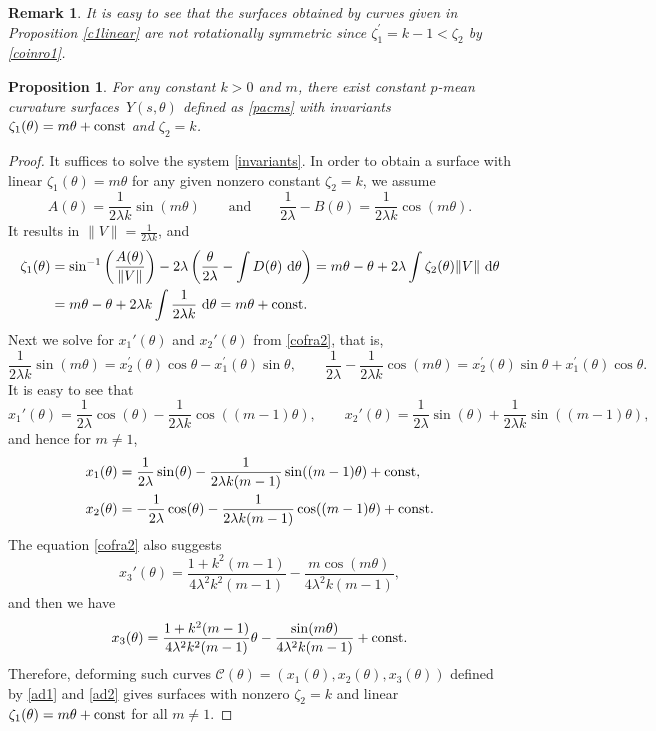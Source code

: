 \documentclass[pdftex]{sigma}
\numberwithin{equation}{section}
\newtheorem{Proposition}[Theorem]{Proposition}
\newtheorem{Remark}[Theorem]{Remark} }
\begin{document}
\begin{Remark}
It is easy to see that the surfaces obtained by curves given in Proposition \ref{c1linear} are not rotationally symmetric since $\zeta_1^{\prime
}=k-1<\zeta_2$ by \eqref{coinro1}.
\end{Remark}


\begin{Proposition}\label{indepc1}
For any constant $k>0$ and $m$, there exist constant $p$-mean curvature surfaces~$Y(s,\theta)$ defined as \eqref{pacms} with invariants $\zeta_1(\theta)=m\theta+\text{\rm const}$ and $\zeta_2=k$.
\end{Proposition}
\begin{proof}
It suffices to solve the system \eqref{invariants}. In order to obtain a surface with linear $\zeta_1(\theta)=m\theta$ for any given nonzero constant $\zeta_2=k$, we assume
\begin{equation}\label{ae}
A(\theta)=\frac{1}{2\lambda k}\sin(m\theta)\qquad\text{and}\qquad \frac{1}{2\lambda}-B(\theta)=\frac{1}{2\lambda k}\cos(m\theta).
\end{equation}
It results in $\|V\|=\frac{1}{2\lambda k}$, and
\begin{align*}
\zeta_1(\theta)&=\sin^{-1}\left(\frac{A(\theta)}{\|V\|}\right)-2\lambda\left(\frac{\theta}{2\lambda}-\int D(\theta)~{\rm d}\theta\right)=m\theta-\theta+2\lambda\int \zeta_2(\theta)\|V\|~{\rm d}\theta\\
&=m\theta-\theta+2\lambda k\int \frac{1}{2\lambda k}~{\rm d}\theta=m\theta+\text{\rm const}.
\end{align*}
Next we solve for $x_1'(\theta)$ and $x_2'(\theta)$ from \eqref{cofra2}, that is,
\[
\frac{1}{2\lambda k}\sin(m\theta)=x^{\prime }_{2}(\theta)\cos{\theta}-x^{\prime }_{1}(\theta)\sin{
\theta}, \qquad
\frac{1}{2\lambda}-\frac{1}{2\lambda k}\cos(m\theta)=x^{\prime }_{2}(\theta)\sin{\theta}+x^{\prime }_{1}(\theta)\cos{
\theta}.
\]
It is easy to see that
\[
x_1'(\theta)=\frac{1}{2\lambda}\cos(\theta)-\frac{1}{2\lambda k}\cos((m-1)\theta), \qquad x_2'(\theta)=\frac{1}{2\lambda}\sin(\theta)+\frac{1}{2\lambda k}\sin((m-1)\theta),\]
and hence for $m\neq 1$,
\begin{align}
x_1(\theta)&=\frac{1}{2\lambda}\sin(\theta)-\frac{1}{2\lambda k(m-1)}\sin((m-1)\theta)+\text{\rm const},\nonumber\\
x_2(\theta)&=-\frac{1}{2\lambda}\cos(\theta)-\frac{1}{2\lambda k(m-1)}\cos((m-1)\theta)+\text{\rm const}.\label{ad1}
\end{align}
The equation \eqref{cofra2} also suggests
\[x_3'(\theta)=\frac{1+k^2(m-1)}{4\lambda^2k^2(m-1)}-\frac{m\cos(m\theta)}{4\lambda^2k(m-1)},\]
and then we have
\begin{equation}\label{ad2}
x_3(\theta)=\frac{1+k^2(m-1)}{4\lambda^2k^2(m-1)}\theta-\frac{\sin(m\theta)}{4\lambda^2k(m-1)}+\text{\rm const}.
\end{equation}
Therefore, deforming such curves $\mathcal{C}(\theta)=(x_{1}(\theta),x_{2}(\theta),x_{3}(\theta))$ defined by \eqref{ad1} and \eqref{ad2} gives surfaces with nonzero $\zeta_2=k$ and linear $\zeta_1(\theta)=m\theta+\text{\rm const}$ for all $m \neq 1$.


\end{proof}
\end{document}

